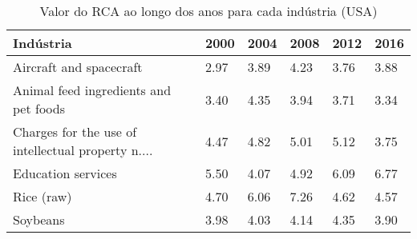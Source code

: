 \begin{table}
\centering
\caption{Valor do RCA ao longo dos anos para cada indústria (USA)}
\begin{tabular}{p{6cm}p{1.5cm}p{1.5cm}p{1.5cm}p{1.5cm}p{1.5cm}}
\toprule
                                         Indústria & 2000 & 2004 & 2008 & 2012 & 2016 \\
\midrule
                           Aircraft and spacecraft & 2.97 & 3.89 & 4.23 & 3.76 & 3.88 \\
             Animal feed ingredients and pet foods & 3.40 & 4.35 & 3.94 & 3.71 & 3.34 \\
Charges for the use of intellectual property n.... & 4.47 & 4.82 & 5.01 & 5.12 & 3.75 \\
                                Education services & 5.50 & 4.07 & 4.92 & 6.09 & 6.77 \\
                                        Rice (raw) & 4.70 & 6.06 & 7.26 & 4.62 & 4.57 \\
                                          Soybeans & 3.98 & 4.03 & 4.14 & 4.35 & 3.90 \\
\bottomrule
\end{tabular}
\end{table}
